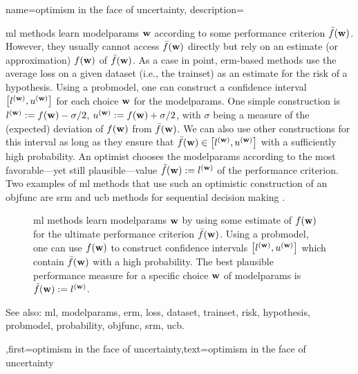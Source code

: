 {name={optimism in the face of uncertainty},
	description={\gls{ml} methods learn \gls{modelparams} ${\bf w}$ 
		according to some performance criterion $\bar{f}({\bf w})$. However, they usually 
		cannot access $\bar{f}({\bf w})$ directly but rely on an estimate (or approximation) 
		$f({\bf w})$ of $\bar{f}({\bf w})$. As a case in point, \gls{erm}-based methods use 
		the average \gls{loss} on a given \gls{dataset} (i.e., the \gls{trainset}) as an estimate 
		for the \gls{risk} of a \gls{hypothesis}. Using a \gls{probmodel}, one can construct 
		a confidence interval 
	$\big[ l^{({\bf w})},  u^{({\bf w})} \big]$ for each choice ${\bf w}$ for the \gls{modelparams}.
		One simple construction is $l^{({\bf w})} := f({\bf w}) - \sigma/2$, $u^{({\bf w})} := f({\bf w})+ \sigma/2$, 
	    with $\sigma$ being a measure of the (expected) deviation of $f({\bf w})$ from $\bar{f}({\bf w})$.
	We can also use other constructions for this interval as long as they ensure that $\bar{f}({\bf w}) \in\big[ l^{({\bf w})},  u^{({\bf w})} \big]$ 
	with a sufficiently high \gls{probability}. An optimist chooses the \gls{modelparams} 
	according to the most favorable—yet still plausible—value $\tilde{f}({\bf w}) :=  l^{({\bf w})}$ 
	of the performance criterion. Two examples of \gls{ml} methods that use such an optimistic 
	construction of an \gls{objfunc} are \gls{srm} \cite[Ch. 11]{ShalevMLBook} and \gls{ucb} methods 
	for sequential decision making \cite[Sec. 2.2]{Bubeck2012}. 
		\begin{figure}[H]
				\begin{center}
\caption{\gls{ml} methods learn \gls{modelparams} ${\bf w}$ by using some estimate of $f({\bf w})$ for 
	the ultimate performance criterion $\bar{f}({\bf w})$. Using a \gls{probmodel}, one can use $f({\bf w})$ to 
	construct confidence intervals $\big[ l^{({\bf w})},  u^{({\bf w})} \big]$ which contain $\bar{f}({\bf w})$  
	with a high probability. The best plausible performance measure for a specific choice ${\bf w}$ of \gls{modelparams} 
	is $\tilde{f}({\bf w}) := l^{({\bf w})}$.} 
	\end{center}
		\end{figure}
		See also: \gls{ml}, \gls{modelparams}, \gls{erm}, \gls{loss}, \gls{dataset}, \gls{trainset}, \gls{risk}, \gls{hypothesis}, \gls{probmodel}, \gls{probability}, \gls{objfunc}, \gls{srm}, \gls{ucb}.},first={optimism in the face of uncertainty},text={optimism in the face of uncertainty} 
}


